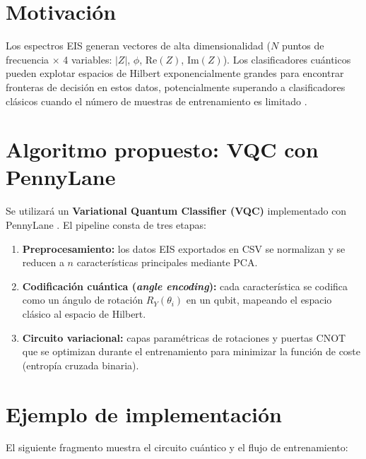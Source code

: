 \documentclass[11pt,a4paper,spanish]{book}
\begin{document}
\section{Motivaci\'{o}n}

Los espectros EIS generan vectores de alta dimensionalidad ($N$ puntos de frecuencia $\times$ 4 variables: $|Z|$, $\phi$, $\mathrm{Re}(Z)$, $\mathrm{Im}(Z)$). Los clasificadores cu\'{a}nticos pueden explotar espacios de Hilbert exponencialmente grandes para encontrar fronteras de decisi\'{o}n en estos datos, potencialmente superando a clasificadores cl\'{a}sicos cuando el n\'{u}mero de muestras de entrenamiento es limitado \citep{havlicek2019}.

\section{Algoritmo propuesto: VQC con PennyLane}

Se utilizar\'{a} un \textbf{Variational Quantum Classifier (VQC)} implementado con PennyLane \citep{pennylane2022}. El pipeline consta de tres etapas:

\begin{enumerate}
	\item \textbf{Preprocesamiento:} los datos EIS exportados en CSV se normalizan y se reducen a $n$ caracter\'{i}sticas principales mediante PCA.
	\item \textbf{Codificaci\'{o}n cu\'{a}ntica (\textit{angle encoding}):} cada caracter\'{i}stica se codifica como un \'{a}ngulo de rotaci\'{o}n $R_Y(\theta_i)$ en un qubit, mapeando el espacio cl\'{a}sico al espacio de Hilbert.
	\item \textbf{Circuito variacional:} capas param\'{e}tricas de rotaciones y puertas CNOT que se optimizan durante el entrenamiento para minimizar la funci\'{o}n de coste (entrop\'{i}a cruzada binaria).
\end{enumerate}

\section{Ejemplo de implementaci\'{o}n}

El siguiente fragmento muestra el circuito cu\'{a}ntico y el flujo de entrenamiento:
\end{document}
